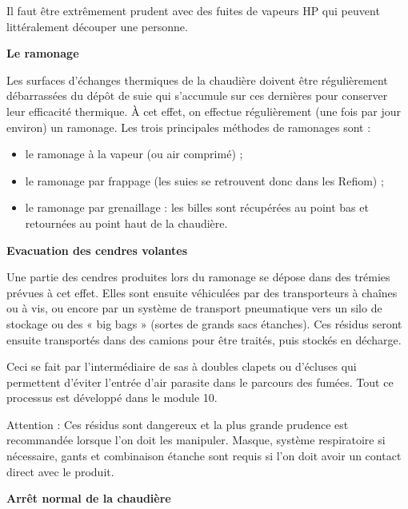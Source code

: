 Il faut être extrêmement prudent avec des fuites de vapeurs HP qui peuvent littéralement découper une personne.


\vspace{0.3cm}
\textbf{Le ramonage}
\vspace{0.3cm} 

Les surfaces d’échanges thermiques de la chaudière doivent être régulièrement débarrassées du dépôt de suie qui s’accumule sur ces dernières pour conserver leur efficacité thermique.
À cet effet, on effectue régulièrement (une fois par jour environ) un ramonage.
Les trois principales méthodes de ramonages sont :


\begin{itemize}
\item  le ramonage à la vapeur (ou air comprimé) ;
\item  le ramonage par frappage (les suies se retrouvent donc dans les Refiom) ;
\item  le ramonage par grenaillage : les billes sont récupérées au point bas et retournées au point haut de la chaudière.
\end{itemize}

\vspace{0.3cm}
\textbf{Evacuation des cendres volantes}
\vspace{0.3cm}

Une partie des cendres produites lors du ramonage se dépose dans des trémies prévues à cet effet. Elles sont ensuite véhiculées par des transporteurs à chaînes ou à vis, ou encore par un système de transport pneumatique vers un silo de stockage ou des « big bags » (sortes de grands sacs étanches). Ces résidus seront ensuite transportés dans des camions pour être traités, puis stockés en décharge.
\vspace{0.3cm}

Ceci se fait par l’intermédiaire de sas à doubles clapets ou d’écluses qui permettent d’éviter l’entrée d’air parasite dans le parcours des fumées. Tout ce processus est développé dans le module 10.
\vspace{0.3cm}

Attention : Ces résidus sont dangereux et la plus grande prudence est recommandée lorsque l’on doit les manipuler. Masque, système respiratoire si nécessaire, gants et combinaison étanche sont requis si l’on doit avoir un contact direct avec le produit.


\vspace{0.3cm}
\textbf{Arrêt normal de la chaudière}
\vspace{0.3cm}

